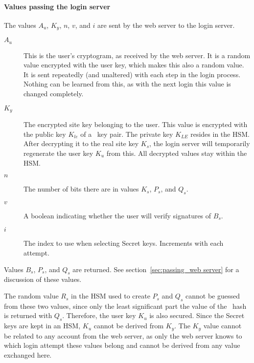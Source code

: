 \paragraph{Values passing the login server}
The values $A_u$, $K_y$, $n$, $v$, and $i$ are sent by the web server to the login server.
\begin{description}
\item[$A_u$]	This is the user's cryptogram, as received by the web server.
	It is a random value encrypted with the user key,
	which makes this also a random value.
	It is sent repeatedly
	(and unaltered)
	with each step in the login process.
	Nothing can be learned from this,
	as with the next login this value is changed completely.
\item[$K_y$]	The encrypted site key belonging to the user.
	This value is encrypted with the public key $K_{le}$ of a \RSA\ key pair.
	The private key $K_{LE}$ resides in the HSM.
	After decrypting it to the real site key $K_s$,
	the login server will temporarily regenerate the user key $K_u$ from this.
	All decrypted values stay within the HSM.
\item[$n$]	The number of bits there are in values $K_s$, $P_s$, and $Q_s$.
\item[$v$]	A boolean indicating whether the user will verify signatures of $B_s$.
\item[$i$]	The index to use when selecting Secret keys.
	Increments with each attempt.
\end{description}
Values $B_s$, $P_s$, and $Q_s$ are returned.
See section~\vref{sec:passing_web server} for a discussion of these values.
\par
The random value $R_s$ in the HSM used to create $P_s$ and $Q_s$ cannot be guessed from these two values,
since only the least significant part the value of the \SHA\ hash is returned with $Q_s$.
Therefore, the user key $K_u$ is also secured.
Since the Secret keys are kept in an HSM,
$K_u$ cannot be derived from $K_y$.
The $K_y$ value cannot be related to any account from the web server,
as only the web server knows to which login attempt these values belong
and cannot be derived from any value exchanged here.

